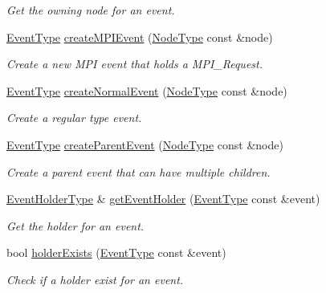 \begin{DoxyCompactItemize}
\begin{DoxyCompactList}\small\item\em Get the owning node for an event. \end{DoxyCompactList}\item 
\hyperlink{namespacevt_a009267401def7ae8bf201892222d060f}{Event\+Type} \hyperlink{structvt_1_1event_1_1_async_event_ae94bb2059c35857a228fd55ab5512272}{create\+M\+P\+I\+Event} (\hyperlink{namespacevt_a866da9d0efc19c0a1ce79e9e492f47e2}{Node\+Type} const \&node)
\begin{DoxyCompactList}\small\item\em Create a new M\+PI event that holds a M\+P\+I\+\_\+\+Request. \end{DoxyCompactList}\item 
\hyperlink{namespacevt_a009267401def7ae8bf201892222d060f}{Event\+Type} \hyperlink{structvt_1_1event_1_1_async_event_aa7c07c129ba54bde5abbe95c543ca352}{create\+Normal\+Event} (\hyperlink{namespacevt_a866da9d0efc19c0a1ce79e9e492f47e2}{Node\+Type} const \&node)
\begin{DoxyCompactList}\small\item\em Create a regular type event. \end{DoxyCompactList}\item 
\hyperlink{namespacevt_a009267401def7ae8bf201892222d060f}{Event\+Type} \hyperlink{structvt_1_1event_1_1_async_event_a9646f211d660d2e991df07b77e5f2cc6}{create\+Parent\+Event} (\hyperlink{namespacevt_a866da9d0efc19c0a1ce79e9e492f47e2}{Node\+Type} const \&node)
\begin{DoxyCompactList}\small\item\em Create a parent event that can have multiple children. \end{DoxyCompactList}\item 
\hyperlink{structvt_1_1event_1_1_async_event_a6b529d829ccb5b12c50c2b1978c41a86}{Event\+Holder\+Type} \& \hyperlink{structvt_1_1event_1_1_async_event_a27d14dba4b35f66aad75d46fb56227a9}{get\+Event\+Holder} (\hyperlink{namespacevt_a009267401def7ae8bf201892222d060f}{Event\+Type} const \&event)
\begin{DoxyCompactList}\small\item\em Get the holder for an event. \end{DoxyCompactList}\item 
bool \hyperlink{structvt_1_1event_1_1_async_event_a8aeeb83c7b467b3d130e522d079e5a7d}{holder\+Exists} (\hyperlink{namespacevt_a009267401def7ae8bf201892222d060f}{Event\+Type} const \&event)
\begin{DoxyCompactList}\small\item\em Check if a holder exist for an event. \end{DoxyCompactList}\item 

\end{DoxyCompactItemize}
